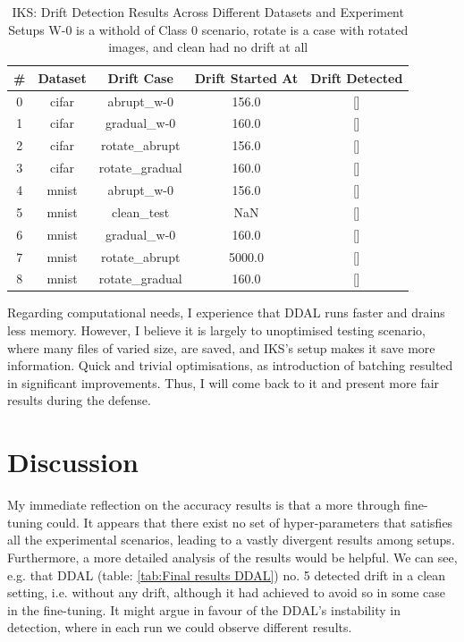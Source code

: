 \documentclass[a4paper]{article}
\begin{document}
\begin{table}[]
    \centering
    \begin{tabular}{c|c|c|c|c}
        \# & Dataset & Drift Case & Drift Started At & Drift Detected \\
        \hline
        0 & cifar & abrupt\_w-0 & 156.0 & [] \\
        1 & cifar & gradual\_w-0 & 160.0 & [] \\
        2 & cifar & rotate\_abrupt & 156.0 & [] \\
        3 & cifar & rotate\_gradual & 160.0 & [] \\
        4 & mnist & abrupt\_w-0 & 156.0 & [] \\
        5 & mnist & clean\_test & NaN & [] \\
        6 & mnist & gradual\_w-0 & 160.0 & [] \\
        7 & mnist & rotate\_abrupt & 5000.0 & [] \\
        8 & mnist & rotate\_gradual & 160.0 & [] \\
    \end{tabular}
    \caption{IKS: Drift Detection Results Across Different Datasets and Experiment Setups
    W-0 is a withold of Class 0 scenario, rotate is a case with rotated images, and clean had no drift at all}
    \label{tab:Final results IKS}
\end{table}

Regarding computational needs, I experience that DDAL runs faster and drains less memory. However, I believe it is largely to unoptimised testing scenario, where many files of varied size, are saved, and IKS's setup makes it save more information. Quick and trivial optimisations, as introduction of batching resulted in significant improvements. Thus, I will come back to it and present more fair results during the defense.

\section{Discussion} %
\label{sec:Discussion}

My immediate reflection on the accuracy results is that a more through fine-tuning could. It appears that there exist no set of hyper-parameters that satisfies all the experimental scenarios, leading to a vastly divergent results among setups. Furthermore, a more detailed analysis of the results would be helpful. We can see, e.g. that DDAL (table: \ref {tab:Final results DDAL}) no. 5 detected drift in a clean setting, i.e. without any drift, although it had achieved to avoid so in some case in the fine-tuning. It might argue in favour of the DDAL's instability in detection, where in each run we could observe different results. 
\end{document}
